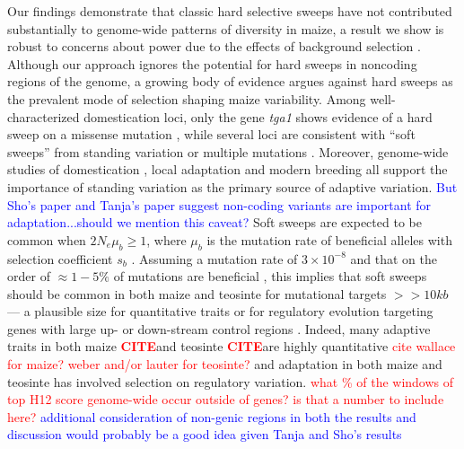 \documentclass{pnastwo}
\newcommand{\jri}[1]{\textcolor{red}{\scriptsize #1}}
\newcommand{\mbh}[1]{\textcolor{blue}{\scriptsize #1}}
\newcommand{\citex}{\textcolor{red}{\bf CITE}}
\begin{document}
\begin{article}
Our findings demonstrate that classic hard selective sweeps have not contributed substantially to genome-wide patterns of diversity in maize, a result we show is robust to concerns about power due to the effects of background selection  \cite{enard2014}. 
Although our approach ignores the potential for hard sweeps in noncoding regions of the genome, a growing body of evidence argues against hard sweeps as the prevalent mode of selection shaping maize variability. 
Among well-characterized domestication loci, only the gene \emph{tga1} shows evidence of a hard sweep on a missense mutation \cite{wang2015}, while several loci are consistent with ``soft sweeps''  from standing variation \cite{studer2011,gallavotti2004role} or multiple mutations \cite{wills2013}. 
Moreover, genome-wide studies of domestication \cite{hufford2012},  local adaptation \cite{Takuno15062015} and modern breeding \cite{beissinger2014} all support the importance of standing variation as the primary source of adaptive variation. \mbh{But Sho's paper and Tanja's paper suggest non-coding variants are important for adaptation...should we mention this caveat?}  
Soft sweeps are expected to be common when $2N_e\mu_b \ge 1$, where $\mu_b$ is the mutation rate of beneficial alleles with selection coefficient $s_b$ \cite{messer2013population}.  
Assuming a mutation rate of $3 \times 10^{-8}$ \cite{clark2005} and that on the order of $\approx 1-5\%$ of mutations are beneficial \cite{eyre2007distribution}, this implies that soft sweeps should be common in both maize and teosinte for mutational targets $>>10kb$ --- a plausible size for quantitative traits or for regulatory evolution targeting genes with large up- or down-stream control regions \cite[e.g.]{studer2011}.
Indeed, many adaptive traits in both maize \citex and teosinte \citex are highly quantitative \jri{cite wallace for maize? weber and/or lauter for teosinte?} and adaptation in both maize \cite{hufford2012} and teosinte \cite{pyhajarvi2013complex} has involved selection on regulatory variation.  \jri{what \% of the windows of top H12 score genome-wide occur outside of genes? is that a number to include here?} \mbh{additional consideration of non-genic regions in both the results and discussion would probably be a good idea given Tanja and Sho's results}


\end{article}
\end{document}
